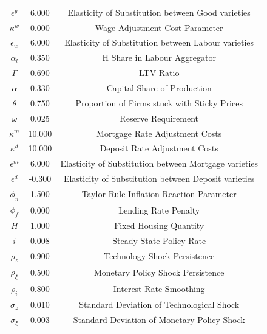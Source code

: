 \begin{center}
\begin{longtable}{ccc}
$\epsilon^y$ 	 & 	 6.000 	 & 	 Elasticity of Substitution between Good varieties\\
$\kappa^w$ 	 & 	 0.000 	 & 	 Wage Adjustment Cost Parameter\\
$\epsilon_w$ 	 & 	 6.000 	 & 	 Elasticity of Substitution between Labour varieties\\
$\alpha_l$ 	 & 	 0.350 	 & 	 H Share in Labour Aggregator\\
$\Gamma$ 	 & 	 0.690 	 & 	 LTV Ratio\\
$\alpha$ 	 & 	 0.330 	 & 	 Capital Share of Production\\
$\theta$ 	 & 	 0.750 	 & 	 Proportion of Firms stuck with Sticky Prices\\
$\omega$ 	 & 	 0.025 	 & 	 Reserve Requirement\\
$\kappa^m$ 	 & 	 10.000 	 & 	 Mortgage Rate Adjustment Costs\\
$\kappa^d$ 	 & 	 10.000 	 & 	 Deposit Rate Adjustment Costs\\
$\epsilon^m$ 	 & 	 6.000 	 & 	 Elasticity of Substitution between Mortgage varieties\\
$\epsilon^d$ 	 & 	 -0.300 	 & 	 Elasticity of Substitution between Deposit varieties\\
$\phi_\pi$ 	 & 	 1.500 	 & 	 Taylor Rule Inflation Reaction Parameter\\
$\phi_f$ 	 & 	 0.000 	 & 	 Lending Rate Penalty\\
$\bar{H}$ 	 & 	 1.000 	 & 	 Fixed Housing Quantity\\
$\bar{i}$ 	 & 	 0.008 	 & 	 Steady-State Policy Rate\\
$\rho_z$ 	 & 	 0.900 	 & 	 Technology Shock Persistence\\
$\rho_\xi$ 	 & 	 0.500 	 & 	 Monetary Policy Shock Persistence\\
$\rho_i$ 	 & 	 0.800 	 & 	 Interest Rate Smoothing\\
$\sigma_z$ 	 & 	 0.010 	 & 	 Standard Deviation of Technological Shock\\
$\sigma_\xi$ 	 & 	 0.003 	 & 	 Standard Deviation of Monetary Policy Shock\\
\bottomrule%
\end{longtable}
\end{center}

